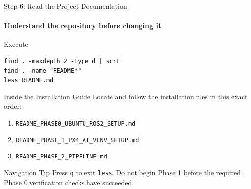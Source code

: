 \begin{frame}[fragile]{Step 6: Read the Project Documentation}
\framesubtitle{Understand the repository before changing it}

\footnotesize

\begin{block}{Execute}
\begin{verbatim}
find . -maxdepth 2 -type d | sort
find . -name "README*"
less README.md
\end{verbatim}
\end{block}

\begin{exampleblock}{Inside the Installation Guide}
Locate and follow the installation files in this exact order:

\begin{enumerate}
    \setlength{\itemsep}{0.15em}
    \item \texttt{README\_PHASE0\_UBUNTU\_ROS2\_SETUP.md}
    \item \texttt{README\_PHASE\_1\_PX4\_AI\_VENV\_SETUP.md}
    \item \texttt{README\_PHASE\_2\_PIPELINE.md}
\end{enumerate}
\end{exampleblock}

\begin{alertblock}{Navigation Tip}
Press \texttt{q} to exit \texttt{less}. Do not begin Phase 1 before the
required Phase 0 verification checks have succeeded.
\end{alertblock}

\end{frame}

